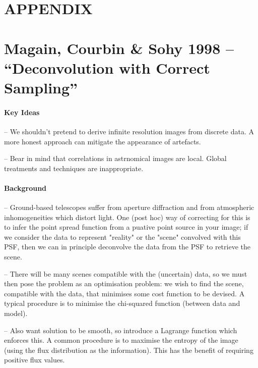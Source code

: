\documentclass[letterpaper, 11pt]{article}
\begin{document}
\newpage
\appendix
{}
\section*{APPENDIX}

\section{Magain, Courbin \& Sohy 1998 -- ``Deconvolution with Correct Sampling''}
\label{sec:MCS98notes}

\paragraph{Key Ideas}

-- We shouldn't pretend to derive infinite resolution images from discrete data. A more honest approach can mitigate the appearance of 
artefacts.

-- Bear in mind that correlations in astrnomical images are local. Global treatments and techniques are inappropriate.


\paragraph{Background}

-- Ground-based telescopes suffer from aperture diffraction and from atmospheric inhomogeneities which distort light. One (post hoc) way of 
correcting for this is to infer the point spread function from a puative point source in your image; if we consider the data to represent 
"reality" or the "scene" convolved with this PSF, then we can in principle deconvolve the data from the PSF to retrieve the scene. 

-- There will be many scenes compatible with the (uncertain) data, so we must then pose the problem as an optimisation problem: we wish to 
find the scene, compatible with the data, that minimises some cost function to be devised. A typical procedure is to minimise the chi-squared 
function (between data and model).

-- Also want solution to be smooth, so introduce a Lagrange function which enforces this. A common procedure is to maximise the entropy of the 
image (using the flux distribution as the information). This has the benefit of requiring positive flux values.
\end{document}
